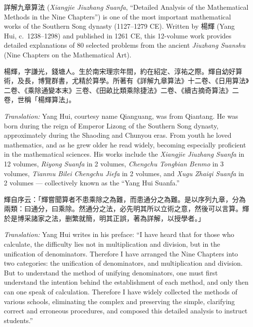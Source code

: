 \documentclass[11pt,a4paper]{article}
\newcommand{\zh}[1]{{#1}}
\newenvironment{chpassage}{%
  \par\medskip
  \begin{center}
  \begin{minipage}{0.95\textwidth}
  \setlength{\parindent}{2em}
  \linespread{1.3}\selectfont
}{%
  \end{minipage}
  \end{center}
  \medskip
}
\begin{document}
\zh{詳解九章算法} (\textit{Xiangjie Jiuzhang Suanfa}, ``Detailed Analysis of
the Mathematical Methods in the Nine Chapters'') is one of the most important
mathematical works of the Southern Song dynasty (1127--1279 CE). Written by
\zh{楊輝} (Yang Hui, c.\ 1238--1298) and published in 1261 CE, this 12-volume
work provides detailed explanations of 80 selected problems from the ancient
\textit{Jiuzhang Suanshu} (Nine Chapters on the Mathematical Art).

\begin{chpassage}
\zh{楊輝，字謙光，錢塘人。生於南宋理宗年間，約在紹定、淳祐之際。輝自幼好算術，及長，博覽群書，尤精於算學。所著有《詳解九章算法》十二卷、《日用算法》二卷、《乘除通變本末》三卷、《田畝比類乘除捷法》二卷、《續古摘奇算法》二卷，世稱「楊輝算法」。}

\medskip
\textit{Translation:} Yang Hui, courtesy name Qianguang, was from Qiantang. He
was born during the reign of Emperor Lizong of the Southern Song dynasty,
approximately during the Shaoding and Chunyou eras. From youth he loved
mathematics, and as he grew older he read widely, becoming especially proficient
in the mathematical sciences. His works include the \textit{Xiangjie Jiuzhang
Suanfa} in 12 volumes, \textit{Riyong Suanfa} in 2 volumes, \textit{Chengchu
Tongbian Benmo} in 3 volumes, \textit{Tianmu Bilei Chengchu Jiefa} in 2
volumes, and \textit{Xugu Zhaiqi Suanfa} in 2 volumes --- collectively known as
the ``Yang Hui Suanfa.''
\end{chpassage}

\begin{chpassage}
\zh{輝自序云：「輝嘗聞算者不患乘除之為難，而患通分之為難。是以序列九章，分為兩類：曰通分，曰乘除。然通分之法，必先明其所以立術之意，然後可以言算。輝於是博采諸家之法，删繁就簡，明其正誤，著為詳解，以授學者。」}

\medskip
\textit{Translation:} Yang Hui writes in his preface: ``I have heard that for
those who calculate, the difficulty lies not in multiplication and division, but
in the unification of denominators. Therefore I have arranged the Nine Chapters
into two categories: the unification of denominators, and multiplication and
division. But to understand the method of unifying denominators, one must first
understand the intention behind the establishment of each method, and only then
can one speak of calculation. Therefore I have widely collected the methods of
various schools, eliminating the complex and preserving the simple, clarifying
correct and erroneous procedures, and composed this detailed analysis to instruct
students.''
\end{chpassage}
\end{document}
